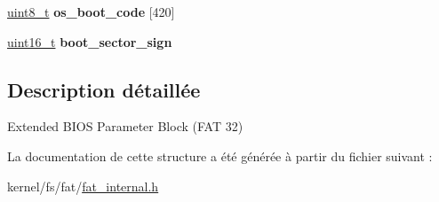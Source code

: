 \begin{DoxyCompactItemize}
\item 
\hypertarget{struct__fat__extended__BIOS__32_ac163d55b696ec5e32d9d74482d6abe38}{\hyperlink{kernel_2include_2types_8h_aba7bc1797add20fe3efdf37ced1182c5}{uint8\-\_\-t} {\bfseries os\-\_\-boot\-\_\-code} \mbox{[}420\mbox{]}}\label{struct__fat__extended__BIOS__32_ac163d55b696ec5e32d9d74482d6abe38}

\item 
\hypertarget{struct__fat__extended__BIOS__32_a2cc6336683f3694723e4118983960174}{\hyperlink{kernel_2include_2types_8h_adf4d876453337156dde61095e1f20223}{uint16\-\_\-t} {\bfseries boot\-\_\-sector\-\_\-sign}}\label{struct__fat__extended__BIOS__32_a2cc6336683f3694723e4118983960174}

\end{DoxyCompactItemize}


\subsection{Description détaillée}
Extended B\-I\-O\-S Parameter Block (F\-A\-T 32) 

La documentation de cette structure a été générée à partir du fichier suivant \-:\begin{DoxyCompactItemize}
\item 
kernel/fs/fat/\hyperlink{fat__internal_8h}{fat\-\_\-internal.\-h}\end{DoxyCompactItemize}
